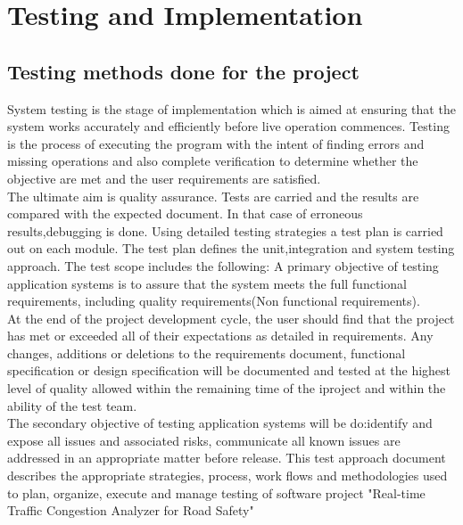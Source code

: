 \chapter{Testing and Implementation}
\section{Testing methods done for the project}
\par
System testing is the stage of implementation which is aimed at ensuring that
the system works accurately and efficiently before live operation commences.
Testing is the process of executing the program with the intent of finding
errors and missing operations and also complete verification to determine
whether the objective are met and the user requirements are satisfied.\\

The ultimate aim is quality assurance. Tests are carried and the results are
compared with the expected document. In that case of erroneous results,debugging
is done. Using detailed testing strategies a test plan is carried out on each
module. The test plan defines the unit,integration and system testing approach.
The test scope includes the following: A primary objective of testing
application systems is to assure that the system meets the full functional
requirements, including quality requirements(Non functional requirements).\\

At the end of the project development cycle, the user should find that the
project has met or exceeded all of their expectations as detailed in
requirements. Any changes, additions or deletions to the requirements document,
functional specification or design specification will be documented and tested
at the highest level of quality allowed within the remaining time of the
iproject and within the ability of the test team.\\

The secondary objective of testing application systems will be do:identify and
expose all issues and associated risks, communicate all known issues are
addressed in an appropriate matter before release. This test approach document
describes the appropriate strategies, process, work flows and methodologies
used to plan, organize, execute and manage testing of software project
"Real-time Traffic Congestion Analyzer for Road Safety"

\newpage

